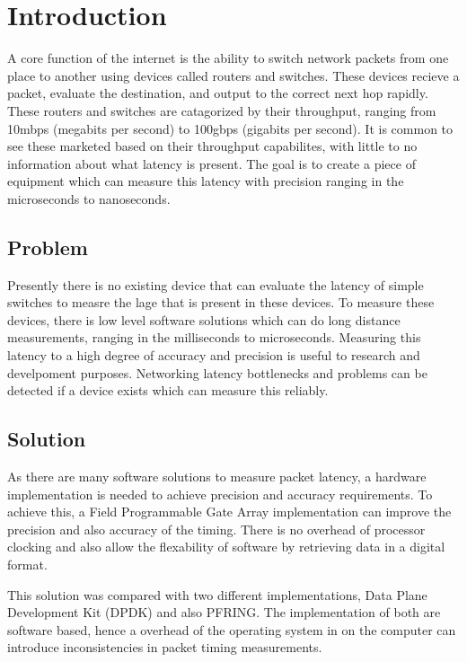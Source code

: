 \chapter{Introduction}\label{C:intro}

\par A core function of the internet is the ability to switch network packets from one place to another using devices called routers and switches.
These devices recieve a packet, evaluate the destination, and output to the correct next hop rapidly.
These routers and switches are catagorized by their throughput, ranging from 10mbps (megabits per second) to 100gbps (gigabits per second).
It is common to see these marketed based on their throughput capabilites, with little to no information about what latency is present.
The goal is to create a piece of equipment which can measure this latency with precision ranging in the microseconds to nanoseconds.

\section{Problem}

\par Presently there is no existing device that can evaluate the latency of simple switches to measre the lage that is present in these devices.
To measure these devices, there is low level software solutions which can do long distance measurements, ranging in the milliseconds to microseconds.
Measuring this latency to a high degree of accuracy and precision is useful to research and develpoment purposes.
Networking latency bottlenecks and problems can be detected if a device exists which can measure this reliably.

\section{Solution}

\par As there are many software solutions to measure packet latency, a hardware implementation is needed to achieve precision and accuracy requirements.
To achieve this, a Field Programmable Gate Array implementation can improve the precision and also accuracy of the timing.
There is no overhead of processor clocking and also allow the flexability of software by retrieving data in a digital format.


\par This solution was compared with two different implementations, Data Plane Development Kit (DPDK) and also PF\textunderscore RING.
The implementation of both are software based, hence a overhead of the operating system in on the computer can introduce inconsistencies in packet timing measurements.

